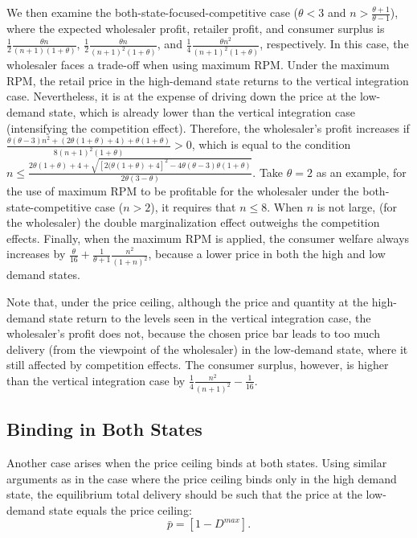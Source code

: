 \documentclass[12pt]{article}
\begin{document}
We then examine the both-state-focused-competitive case ($\theta < 3$ and $n > \frac{\theta + 1}{\theta - 1}$), where the expected wholesaler profit, retailer profit, and consumer surplus is  $\frac{1}{2}\frac{\theta n}{(n + 1)(1+\theta)}$, $\frac{1}{2}\frac{\theta n}{(n+1)^2(1+\theta)}$, and $\frac{1}{4}\frac{\theta n^2}{(n+1)^2(1+\theta)}$, respectively. In this case, the wholesaler faces a trade-off when using maximum RPM.  Under the maximum RPM, the retail price in the high-demand state returns to the vertical integration case. Nevertheless, it is at the expense of driving down the price at the low-demand state, which is already lower than the vertical integration case (intensifying the competition effect). Therefore, the wholesaler's profit increases if 
$\frac{\theta(\theta - 3)n^2 + (2\theta(1+\theta) + 4) + \theta(1+\theta)}{8(n+1)^2(1 + \theta)} > 0$, which is equal to the condition $n \leq \frac{2\theta(1 + \theta) + 4 + \sqrt{[2(\theta(1+\theta) + 4]^2 - 4\theta(\theta - 3)\theta(1+\theta)}}{2\theta(3 - \theta)}$. Take $\theta = 2$ as an example, for the use of maximum RPM to be profitable for the wholesaler under the both-state-competitive case ($n > 2$), it requires that $n \leq 8$. When $n$ is not large, (for the wholesaler) the double marginalization effect outweighs the competition effects. Finally, when the maximum RPM is applied, the consumer welfare always increases by $\frac{\theta}{16} + \frac{1}{\theta + 1}\frac{n^2}{(1+n)^2}$, because a lower price in both the high and low demand states. 

Note that, under the price ceiling, although the price and quantity at the high-demand state return to the levels seen in the vertical integration case, the wholesaler's profit does not, because the chosen price bar leads to too much delivery (from the viewpoint of the wholesaler) in the low-demand state, where it still affected by competition effects. The consumer surplus, however, is higher than the vertical integration case by $\frac{1}{4}\frac{n^2}{(n+1)^2} - \frac{1}{16}$.


\subsection{Binding in Both States}

Another case arises when the price ceiling binds at both states. Using similar arguments as in the case where the price ceiling binds only in the high demand state, the equilibrium total delivery should be such that the price at the low-demand state equals the price ceiling:
\begin{equation}
	\bar{p} = \left[1 - D^{max}\right].
\end{equation}
\end{document}
